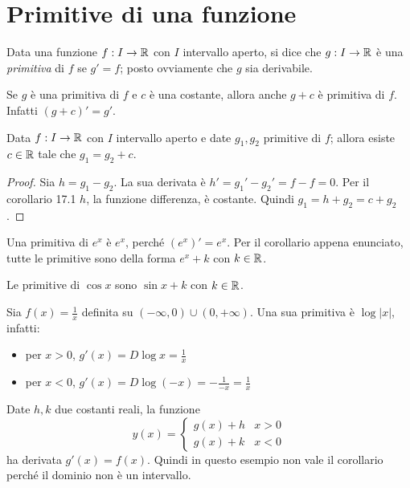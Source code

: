 \section{Primitive di una funzione}

\begin{definition}
Data una funzione $f: I \to \mathbb R$ con $I$ intervallo aperto, si dice che $g: I \to \mathbb R$ è una \emph{primitiva} di $f$ se $g' = f$; posto ovviamente che $g$ sia derivabile.
\end{definition}

\begin{remark}
Se $g$ è una primitiva di $f$ e $c$ è una costante, allora anche $g+c$ è primitiva di $f$. Infatti $(g+c)' = g'$.
\end{remark}

\begin{corollary}
Data $f: I \to \mathbb R$ con $I$ intervallo aperto e date $g_1, g_2$ primitive di $f$; allora esiste $c \in \mathbb R$ tale che $g_1 = g_2 + c$.
\end{corollary}

\begin{proof}
Sia $h = g_1 - g_2$. La sua derivata è $h' = {g_1}' - {g_2}' = f - f = 0$. Per il corollario 17.1 $h$, la funzione differenza, è costante. Quindi $g_1 = h + g_2 = c + g_2$.
\end{proof}

\begin{example}
Una primitiva di $e^x$ è $e^x$, perché $(e^x)' = e^x$. Per il corollario appena enunciato, tutte le primitive sono della forma $e^x + k$ con $k \in \mathbb R$.
\end{example}

\begin{example}
Le primitive di $\cos x$ sono $\sin x + k$ con $k \in \mathbb R$.
\end{example}

\begin{remark}
Sia $f(x) = \frac{1}{x}$ definita su $(-\infty, 0) \cup (0, +\infty)$. Una sua primitiva è $\log |x|$, infatti:
\begin{itemize}
\item per $x > 0$, $g'(x) = D \log x = \frac{1}{x}$
\item per $x < 0$, $g'(x) = D \log (-x) = -\frac{1}{-x} = \frac{1}{x}$
\end{itemize}

Date $h, k$ due costanti reali, la funzione
\begin{equation*}
y(x) = \begin{cases}
g(x)+h & x > 0\\
g(x)+k & x < 0
\end{cases}
\end{equation*}
ha derivata $g'(x) = f(x)$. Quindi in questo esempio non vale il corollario perché il dominio non è un intervallo.
\end{remark}

